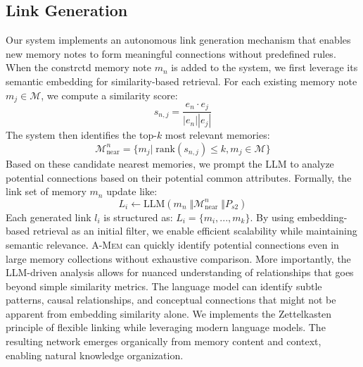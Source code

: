 \documentclass{article}
\newcommand{\ours}{\textsc{A-Mem}\xspace}
\begin{document}
\subsection{Link Generation}
Our system implements an autonomous link generation mechanism that enables new memory notes to form meaningful connections without predefined rules. When the constrctd memory note $m_n$ is added to the system, we first 
leverage its semantic embedding for similarity-based retrieval. 
For each existing memory note $m_j \in \mathcal{M}$, we compute a similarity score:
\begin{equation}
s_{n,j} = \frac{e_{n} \cdot e_j}{|e_{n}| |e_j|} 
\end{equation}
The system then identifies the top-$k$ most relevant memories:
\begin{equation}
    \mathcal{M}_{\text{near}}^n = \{m_j | \; \text{rank}(s_{n,j}) \leq k, m_j \in \mathcal{M}\}
\end{equation}
Based on these candidate nearest memories, we prompt the LLM to analyze potential connections based on their potential common attributes. Formally, the link set of memory $m_n$ update like:
\begin{equation}
    L_i \leftarrow   \text{LLM} (m_n \; \Vert  \mathcal{M}_{\text{near}}^n \; \Vert P_{s2})
\end{equation}
Each generated link $l_i$ is structured as:
$L_i = \{m_{i},..., m_{k}\}$. 
By using embedding-based retrieval as an initial filter, we enable efficient scalability while maintaining semantic relevance. \ours can quickly identify potential connections even in large memory collections without exhaustive comparison.
More importantly, the LLM-driven analysis allows for nuanced understanding of relationships that goes beyond simple similarity metrics. The language model can identify subtle patterns, causal relationships, and conceptual connections that might not be apparent from embedding similarity alone. We implements the Zettelkasten principle of flexible linking while leveraging modern language models. The resulting network emerges organically from memory content and context, enabling natural knowledge organization.
\end{document}
